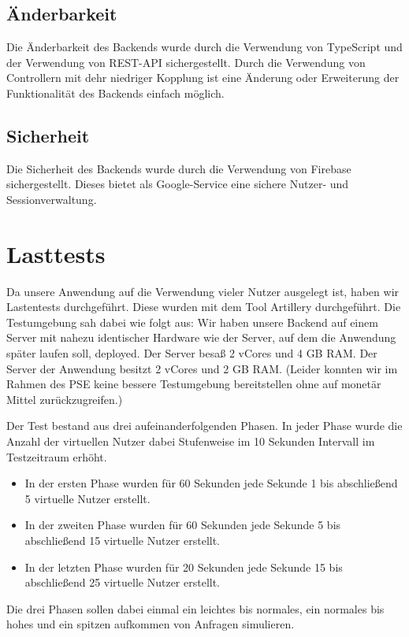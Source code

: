 \documentclass{qualitätssicherungsheft}
\begin{document}
\subsection{Änderbarkeit}
Die Änderbarkeit des Backends wurde durch die Verwendung von TypeScript und der Verwendung von REST-API sichergestellt.
Durch die Verwendung von Controllern mit dehr niedriger Kopplung ist eine Änderung oder Erweiterung der Funktionalität des Backends einfach möglich.

\subsection{Sicherheit}
Die Sicherheit des Backends wurde durch die Verwendung von Firebase sichergestellt. 
Dieses bietet als Google-Service eine sichere Nutzer- und Sessionverwaltung.

\section{Lasttests}
Da unsere Anwendung auf die Verwendung vieler Nutzer ausgelegt ist, haben wir Lastentests durchgeführt.
Diese wurden mit dem Tool Artillery durchgeführt.
Die Testumgebung sah dabei wie folgt aus:
Wir haben unsere Backend auf einem Server mit nahezu identischer Hardware wie der Server, auf dem die Anwendung später laufen soll, deployed.
Der Server besaß 2 vCores und 4 GB RAM.
Der Server der Anwendung besitzt 2 vCores und 2 GB RAM.
(Leider konnten wir im Rahmen des PSE keine bessere Testumgebung bereitstellen ohne auf monetär Mittel zurückzugreifen.)

Der Test bestand aus drei aufeinanderfolgenden Phasen.
In jeder Phase wurde die Anzahl der virtuellen Nutzer dabei Stufenweise im 10 Sekunden Intervall im Testzeitraum erhöht.
\begin{itemize}
    \item In der ersten Phase wurden für 60 Sekunden jede Sekunde 1 bis abschließend 5 virtuelle Nutzer erstellt.
    \item In der zweiten Phase wurden für 60 Sekunden jede Sekunde 5 bis abschließend 15 virtuelle Nutzer erstellt.
    \item In der letzten Phase wurden für 20 Sekunden jede Sekunde 15 bis abschließend 25 virtuelle Nutzer erstellt.
\end{itemize}

Die drei Phasen sollen dabei einmal ein leichtes bis normales, ein normales bis hohes und ein spitzen aufkommen von Anfragen simulieren.
\end{document}
